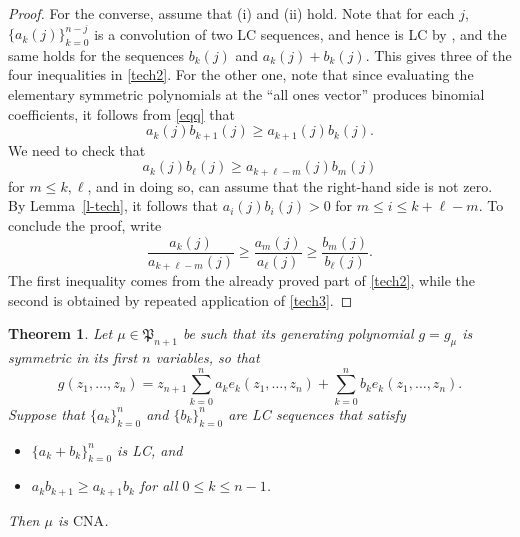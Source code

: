 \documentclass[10pt,reqno]{amsart}
\theoremstyle{plain}
\newtheorem{theorem}{Theorem}[section]
\theoremstyle{definition}
\theoremstyle{remark}
\newcommand{\CNA}{\text{CNA}}
\newcommand{\fP}{\mathfrak{P}}
\begin{document}
\begin{proof}
For the converse, assume that (i) and (ii) hold. Note that for  
each $j$, $\{a_k(j)\}_{k=0}^{n-j}$
is a convolution of two LC sequences, and hence is LC by 
\cite[Theorem 1.2 on p.~394]{Kar},
and the same holds for the sequences $b_k(j)$ and $a_k(j)+b_k(j)$.  
This gives three of the
four inequalities in \eqref{tech2}. For the other one, note that since  
evaluating the elementary symmetric
polynomials at the ``all ones vector'' produces binomial coefficients, 
it follows 
from \eqref{eqq} that
\begin{equation}\label{tech3}
a_k(j)b_{k+1}(j)\geq a_{k+1}(j)b_k(j).
\end{equation}
We need to check that 
$$a_k(j)b_\ell(j)\geq a_{k+\ell-m}(j)b_m(j)$$
for $m\leq k,\ell$, and in doing so, can assume that the right-hand side is  
not zero. By Lemma~\ref{l-tech},
it follows that $a_i(j)b_i(j)>0$ for $m\leq i\leq k+\ell-m$. To conclude  
the proof, write
$$\frac{a_k(j)}{a_{k+\ell-m}(j)}\geq 
\frac{a_m(j)}{a_\ell(j)}\geq\frac{b_m (j)}{b_\ell(j)}.$$
The first inequality comes from the already proved part of 
\eqref{tech2}, while  the second
is obtained by repeated application of \eqref{tech3}. 
\end{proof}

\begin{theorem}\label{th-a-ex}
Let $\mu\in\fP_{n+1}$ be such that its generating polynomial $g=g_\mu$ 
is symmetric in its first $n$ variables, so that
$$
g(z_1,\ldots,z_n)= z_{n+1}\sum_{k=0}^{n}a_ke_k(z_1,\ldots, z_n)+
\sum_{k=0}^{n}b_ke_k(z_1,\ldots, z_n).
$$
Suppose that $\{a_k\}_{k=0}^n$ and $\{b_k\}_{k=0}^n$ are LC 
sequences that satisfy
\begin{itemize} 
\item[(i)] $\{a_k +  b_k\}_{k=0}^n$ is LC, and 
\item[(ii)] $a_kb_{k+1} \geq a_{k+1}b_k$ for all $0 \leq k \leq n-1$. 
\end{itemize}
Then $\mu$ is $\CNA$. 
\end{theorem}
\end{document}

